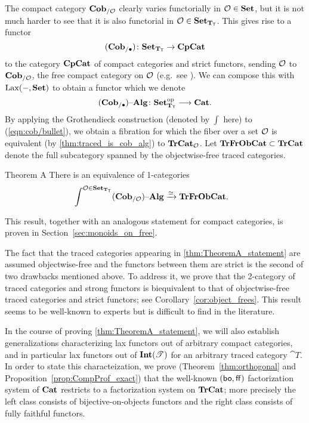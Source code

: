 \documentclass[11pt,oneside,article]{memoir}
\begin{document}
The compact category $\mathbf{Cob}_{/\mathcal{O}}$ clearly varies functorially in $\mathcal{O}\in\mathbf{Set}$, but it is not
much harder to see that it is also functorial in $\mathcal{O}\in\mathbf{Set}_{\mathbf{T}_{\mathsf{T}}}$.  This gives rise to a functor
\[
  (\mathbf{Cob}_{/\bullet})\colon\mathbf{Set}_{\mathbf{T}_{\mathsf{T}}}\to\mathbf{CpCat}
\]
to the category $\mathbf{CpCat}$ of compact categories and strict functors, sending $\mathcal{O}$ to
$\mathbf{Cob}_{/\mathcal{O}}$, the free compact category on $\mathcal{O}$ (e.g.\ see \cite{KellyLaplaza,Abramsky2}).
We can compose this with $\operatorname{Lax}(-,\mathbf{Set})$ to obtain a functor which we denote
\begin{equation}
    \label{eqn:cob/bullet}
  (\mathbf{Cob}_{/\bullet}){\text \textendash}\mathbf{Alg}\colon\mathbf{Set}_{\mathbf{T}_{\mathsf{T}}}^{\mathrm{op}}\longrightarrow\mathbf{Cat}.
\end{equation}
By applying the Grothendieck construction (denoted by $\int$ here) to (\ref{eqn:cob/bullet}), we
obtain a fibration for which the fiber over a set $\mathcal{O}$ is equivalent (by
\ref{thm:traced_is_cob_alg}) to $\mathbf{TrCat}_{\mathcal{O}}$. Let $\mathbf{TrFrObCat}\subset\mathbf{TrCat}$ denote the full
subcategory spanned by the objectwise-free traced categories.

\begin{named}{Theorem A}
    \label{thm:TheoremA_statement}
  There is an equivalence of 1-categories
  \begin{align*}
    &\int^{\mathcal{O}\in\mathbf{Set}_{\mathbf{T}_{\mathsf{T}}}}(\mathbf{Cob}_{/\mathcal{O}}){\text \textendash}\mathbf{Alg}\xrightarrow{\simeq} \mathbf{TrFrObCat}.
  \end{align*}
\end{named}

This result, together with an analogous statement for compact categories, is proven in Section~\ref{sec:monoids_on_free}.

The fact that the traced categories appearing in \ref{thm:TheoremA_statement} are assumed
objectwise-free and the functors between them are strict is the second of two drawbacks mentioned
above. To address it, we prove that the 2-category of traced categories and strong functors is
biequivalent to that of objectwise-free traced categories and strict functors; see
Corollary~\ref{cor:object_frees}. This result seems to be well-known to experts but is difficult to
find in the literature.

In the course of proving \ref{thm:TheoremA_statement}, we will also establish generalizations
characterizing lax functors out of arbitrary compact categories, and in particular lax functors out
of $\mathbf{Int}(\mathscr{T})$ for an arbitrary traced category $\cat{T}$. In order to state this
characteization, we prove (Theorem~\ref{thm:orthogonal} and Proposition~\ref{prop:CompProf_exact})
that the well-known $(\mathsf{bo},\mathsf{ff})$ factorization system of $\mathbf{Cat}$ restricts to a factorization system
on $\mathbf{TrCat}$; more precisely the left class consists of bijective-on-objects functors and the right
class consists of fully faithful functors.
\end{document}
